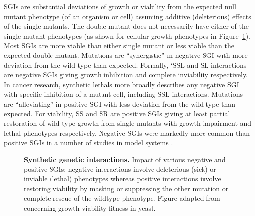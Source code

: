 \glspl{SGI} are substantial deviations of growth or viability from the expected null \gls{mutant} phenotype (of an organism or cell) assuming additive (deleterious) effects of the single \glspl{mutant}. The double \gls{mutant} does not necessarily have either of the single \gls{mutant} phenotypes (as shown for cellular growth phenotypes in Figure~\ref{fig:Costanzo2011}). Most \glspl{SGI} are more viable than either single \gls{mutant} or less viable than the expected double \gls{mutant}. Mutations are ``synergistic'' in negative \gls{SGI} with more deviation from the \gls{wild-type} than expected. Formally, `\gls{SSL} and \gls{SL} interactions are negative \glspl{SGI} giving growth inhibition and complete inviability respectively. In cancer research, \glspl{synthetic lethal} more broadly describes any negative \gls{SGI} with specific inhibition of a \gls{mutant} cell, including \gls{SSL} interactions. Mutations are ``alleviating'' in positive \gls{SGI} with less deviation from the \gls{wild-type} than expected. For viability, \gls{SS} and \gls{SR} are positive \glspl{SGI} giving at least partial restoration of \gls{wild-type} growth from single \glspl{mutant} with growth impairment and lethal phenotypes respectively. Negative \glspl{SGI} were markedly more common than positive \glspl{SGI} in a number of studies in model systems \citep{Tong2004, Boucher2013}. 

\begin{figure}[!ht]
   \caption[Synthetic genetic interactions]{\small \textbf{Synthetic genetic interactions.} Impact of various negative and positive \glspl{SGI}: negative interactions involve deleterious (sick) or inviable (lethal) phenotypes whereas positive interactions involve restoring viability by masking or suppressing the other \gls{mutation} or complete rescue of the wildtype phenotype. Figure adapted from \citep{Costanzo2011} concerning growth viability fitness in yeast.}
\label{fig:Costanzo2011}
\end{figure}

